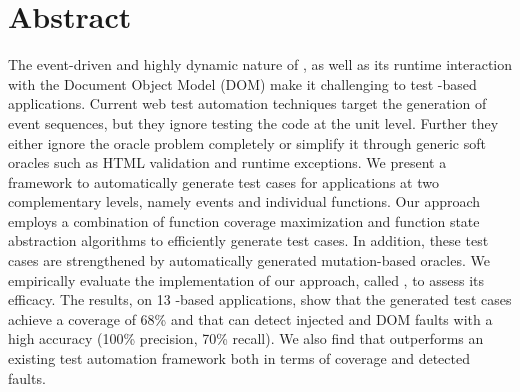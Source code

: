 \section{Abstract}
The event-driven and highly dynamic nature of \javascript, as well as its runtime interaction with the Document Object Model (DOM) make it  challenging to test \javascript-based applications.
Current web test automation techniques target the generation of event sequences, but they ignore testing the \javascript code at the unit level. Further they either ignore the oracle problem completely or simplify it through generic soft oracles such as HTML validation and runtime exceptions. We present a framework \cite{mirshokraie:icst15, shabnam:ase13} to automatically generate test cases for \javascript applications at two complementary levels, namely events and individual \javascript  
functions. 
Our approach employs a combination of function coverage maximization and function state abstraction algorithms to efficiently generate  test cases. In addition, these test cases are strengthened by automatically generated mutation-based oracles. %
We empirically evaluate the implementation of our approach, called \jseft, to assess its efficacy. 
The results, on 13 \javascript-based applications, show that the generated test cases achieve a coverage of 68\% and that \jseft can detect injected \javascript and DOM faults with a high accuracy (100\% precision, 70\% recall).
We also find that \jseft outperforms an existing \javascript test automation framework both in terms of coverage and detected faults.

